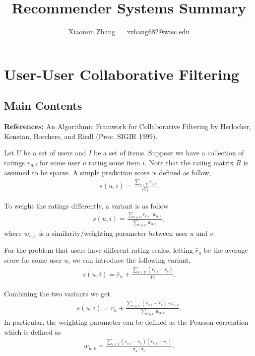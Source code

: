 \documentclass{article}
\title{Recommender Systems Summary}
\author{Xiaomin Zhang $\quad $ \href{mailto:xzhang682@wisc.edu}{xzhang682@wisc.edu} }
\theoremstyle{definition}
\begin{document}
\maketitle




\section{User-User Collaborative Filtering}

\subsection{Main Contents}
\textbf{References:} An Algorithmic Framwork for Collaborative Filtering by Herlocker, Konstan, Borchers, and Riedl (Proc. SIGIR 1999).

Let $U$ be a set of users and $I$ be a set of items. Suppose we have a collection of ratings $r_{u,i}$ for some user $u$ rating some item $i$. Note that the rating matrix $R$ is assumed to be sparse. A simple prediction score is defined as follow,
\begin{align}
    s(u,i) = \frac{\sum_{v \in U} r_{v, i} }{|U|}.
\end{align}

To weight the ratings differently, a variant is as follow
\begin{align}
    s(u,i) = \frac{\sum_{v \in U} r_{v, i} \cdot w_{u,v} }{\sum_{v\in U} w_{u, v}},
\end{align}
where $w_{u,v}$ is a similarity/weighting parameter between user $u$ and $v$. 

For the problem that users have different rating scales, letting $\bar{r}_u$ be the average score for some user $u$, we can introduce the following variant,
\begin{align}
    s(u,i) = \bar{r}_{u} + \frac{\sum_{v\in U} (r_{v, i} - \bar{r}_v)}{|U|}.
\end{align}

Combining the two variants we get 
\begin{align}
    s(u,i) = \bar{r}_{u} + \frac{\sum_{v\in U} (r_{v, i} - \bar{r}_v) \cdot w_{u, v}}{\sum_{v\in U} w_{u, v}}.
\end{align}
In particular, the weighting parameter can be defined as the Pearson correlation which is defined as 
\begin{align*}
    w_{u,v} = \frac{\sum_{i \in I} (r_{u,i} - r_u)(r_{v,i} - r_v)}{\sigma_u \cdot \sigma_v}.
\end{align*}
\end{document}
